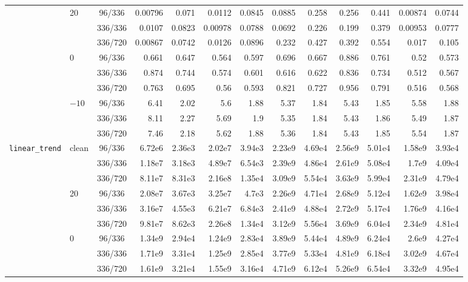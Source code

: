\documentclass[12pt]{article}
\theoremstyle{definition}
\begin{document}
{\begin{enumerate}[label=\textbf{1.2.\arabic*}, leftmargin=*]
{\begin{longtable}{@{}llc@{\hspace{6pt}}rr@{\hspace{8pt}}rr@{\hspace{8pt}}rr@{\hspace{8pt}}rr@{\hspace{8pt}}rr@{}}
\addlinespace[2pt]
 & 20 & 96/336 & 0.00796 & 0.071 & 0.0112 & 0.0845 & 0.0885 & 0.258 & 0.256 & 0.441 & 0.00874 & 0.0744 \\
 &  & 336/336 & 0.0107 & 0.0823 & 0.00978 & 0.0788 & 0.0692 & 0.226 & 0.199 & 0.379 & 0.00953 & 0.0777 \\
 &  & 336/720 & 0.00867 & 0.0742 & 0.0126 & 0.0896 & 0.232 & 0.427 & 0.392 & 0.554 & 0.017 & 0.105 \\
\addlinespace[2pt]
 & 0 & 96/336 & 0.661 & 0.647 & 0.564 & 0.597 & 0.696 & 0.667 & 0.886 & 0.761 & 0.52 & 0.573 \\
 &  & 336/336 & 0.874 & 0.744 & 0.574 & 0.601 & 0.616 & 0.622 & 0.836 & 0.734 & 0.512 & 0.567 \\
 &  & 336/720 & 0.763 & 0.695 & 0.56 & 0.593 & 0.821 & 0.727 & 0.956 & 0.791 & 0.516 & 0.568 \\
\addlinespace[2pt]
 & $-10$ & 96/336 & 6.41 & 2.02 & 5.6 & 1.88 & 5.37 & 1.84 & 5.43 & 1.85 & 5.58 & 1.88 \\
 &  & 336/336 & 8.11 & 2.27 & 5.69 & 1.9 & 5.35 & 1.84 & 5.43 & 1.86 & 5.49 & 1.87 \\
 &  & 336/720 & 7.46 & 2.18 & 5.62 & 1.88 & 5.36 & 1.84 & 5.43 & 1.85 & 5.54 & 1.87 \\
\midrule
\texttt{linear\_trend} & clean & 96/336 & 6.72e6 & 2.36e3 & 2.02e7 & 3.94e3 & 2.23e9 & 4.69e4 & 2.56e9 & 5.01e4 & 1.58e9 & 3.93e4 \\
 &  & 336/336 & 1.18e7 & 3.18e3 & 4.89e7 & 6.54e3 & 2.39e9 & 4.86e4 & 2.61e9 & 5.08e4 & 1.7e9 & 4.09e4 \\
 &  & 336/720 & 8.11e7 & 8.31e3 & 2.16e8 & 1.35e4 & 3.09e9 & 5.54e4 & 3.63e9 & 5.99e4 & 2.31e9 & 4.79e4 \\
\addlinespace[2pt]
 & 20 & 96/336 & 2.08e7 & 3.67e3 & 3.25e7 & 4.7e3 & 2.26e9 & 4.71e4 & 2.68e9 & 5.12e4 & 1.62e9 & 3.98e4 \\
 &  & 336/336 & 3.16e7 & 4.55e3 & 6.21e7 & 6.84e3 & 2.41e9 & 4.88e4 & 2.72e9 & 5.17e4 & 1.76e9 & 4.16e4 \\
 &  & 336/720 & 9.81e7 & 8.62e3 & 2.26e8 & 1.34e4 & 3.12e9 & 5.56e4 & 3.69e9 & 6.04e4 & 2.34e9 & 4.81e4 \\
\addlinespace[2pt]
 & 0 & 96/336 & 1.34e9 & 2.94e4 & 1.24e9 & 2.83e4 & 3.89e9 & 5.44e4 & 4.89e9 & 6.24e4 & 2.6e9 & 4.27e4 \\
 &  & 336/336 & 1.71e9 & 3.31e4 & 1.25e9 & 2.85e4 & 3.77e9 & 5.33e4 & 4.81e9 & 6.18e4 & 3.02e9 & 4.67e4 \\
 &  & 336/720 & 1.61e9 & 3.21e4 & 1.55e9 & 3.16e4 & 4.71e9 & 6.12e4 & 5.26e9 & 6.54e4 & 3.32e9 & 4.95e4 \\

\end{longtable}}
\end{enumerate}}
\end{document}
